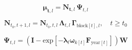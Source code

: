 \documentclass{article}
\begin{document}

\begin{equation}
  \label{eq:model-process}
  \boldsymbol{\mu}_{\boldsymbol{t},l} = \boldsymbol{N}_{\boldsymbol{t},l} \, \boldsymbol{\Psi}_{t,l}
\end{equation}


\begin{equation}
  \label{eq:model-numbers}
  \boldsymbol{N}_{t_{0}, t+1, l} = \boldsymbol{N}_{t_{0}, t, l} \,
    \boldsymbol{\Lambda}_{t,l} \,
    \boldsymbol{\Gamma}_{\mathrm{block}[t],l} \mathrm{,} \quad t \geq t_0
\end{equation}

\begin{equation}
  \label{eq:model-reporting}
  \boldsymbol{\Psi}_{t,l} = \left( \boldsymbol{I} - \mathrm{exp} \! \left[ -
    \boldsymbol{\lambda}_{l} \boldsymbol{\omega}_{k[t]}  
    \boldsymbol{F}_{\mathrm{year}[t]} \right] \right) \boldsymbol{W}
\end{equation}


\end{document}
